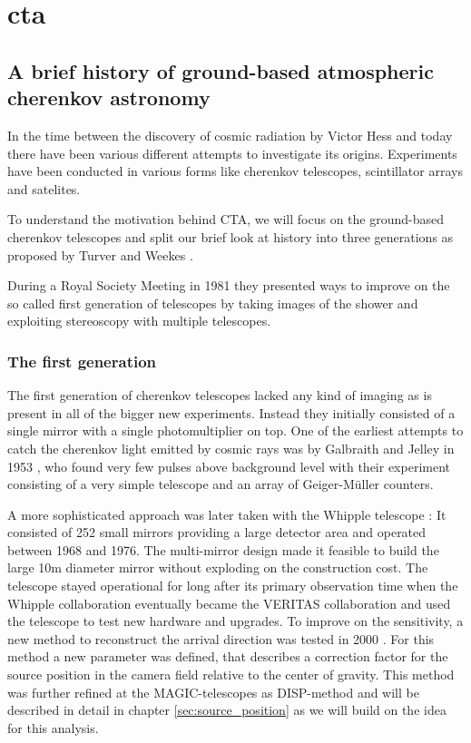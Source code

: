 \chapter{cta}
\label{cta}


\section{A brief history of  ground-based atmospheric cherenkov astronomy}
In the time between the discovery of cosmic radiation by Victor Hess \cite{Hess:1912srp}
and today there have been various different attempts to investigate its origins.
Experiments have been conducted in various forms like cherenkov telescopes, scintillator 
arrays and satelites.

To understand the motivation behind CTA, 
we will focus on the ground-based 
cherenkov telescopes and split our brief look at history 
into three generations as proposed by Turver and Weekes \cite{turver1980}.

During a Royal Society Meeting in 1981 they presented ways to improve on
the so called first generation of telescopes by taking images of the shower
and exploiting stereoscopy with multiple telescopes.

\subsection{The first generation}
\label{sec:1stgen_iact}
The first generation of cherenkov telescopes 
lacked any kind of imaging as is present in all of the bigger new experiments.
Instead they initially consisted of a single mirror with a single photomultiplier on top.
One of the earliest attempts to catch the cherenkov light emitted by cosmic rays 
was by Galbraith and Jelley in 1953 \cite{1953Natur.171..349G}, who found very few pulses
above background level with their experiment consisting of a very simple 
telescope and an array of Geiger-Müller counters.

A more sophisticated approach was later taken with the Whipple telescope \cite{whipple1968}:
It consisted of 252 small mirrors providing a large detector area and operated between 
1968 and 1976. The multi-mirror design made it feasible to build the large 10m diameter 
mirror without exploding on the construction cost.
The telescope stayed operational for long after its primary observation time
when the Whipple collaboration eventually became the VERITAS collaboration 
and used the telescope to test new hardware and upgrades.
To improve on the sensitivity, a new method to reconstruct 
the arrival direction was tested in 2000 \cite{Lessard:2000yf}.
For this method a new parameter was defined, that describes a correction factor 
for the source position in the camera field relative to the center of gravity.
This method was further refined at the MAGIC-telescopes as DISP-method and will be described 
in detail in chapter \ref{sec:source_position} as we will build on the idea
for this analysis.

